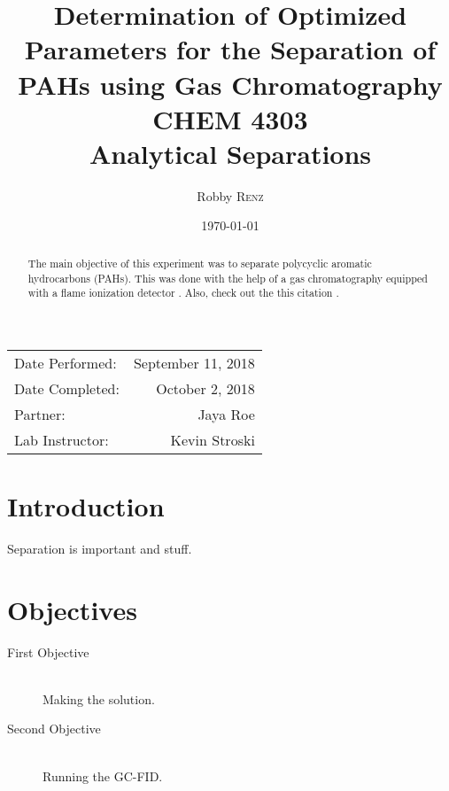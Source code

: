 \documentclass[a4paper, 12pt]{article}
\title{Determination of Optimized Parameters for the Separation of PAHs using Gas Chromatography \\ CHEM 4303 \\ Analytical Separations} %
\author{Robby \textsc{Renz}} %
\date{\today} %
\begin{document}
\maketitle %

\begin{center}
\begin{tabular}{l r}
Date Performed: & September 11, 2018 \\ %
Date Completed: & October 2, 2018 \\
Partner: & Jaya Roe \\ %
Lab Instructor: & Kevin Stroski %
\end{tabular}
\end{center}


\begin{abstract}
	
	The main objective of this experiment was to separate polycyclic aromatic hydrocarbons (PAHs). This was done with the help of a gas chromatography equipped with a flame ionization detector \cite{Smith:2012qr}. Also, check out the this citation \cite{pah-in-soil}.
\end{abstract}

\newpage


\section{Introduction}
Separation is important and stuff.


\section{Objectives}

\begin{description}
	\item[First Objective] \hfill \\
	Making the solution.
	\item[Second Objective] \hfill \\
	Running the GC-FID.
\end{description}
 
\end{document}
